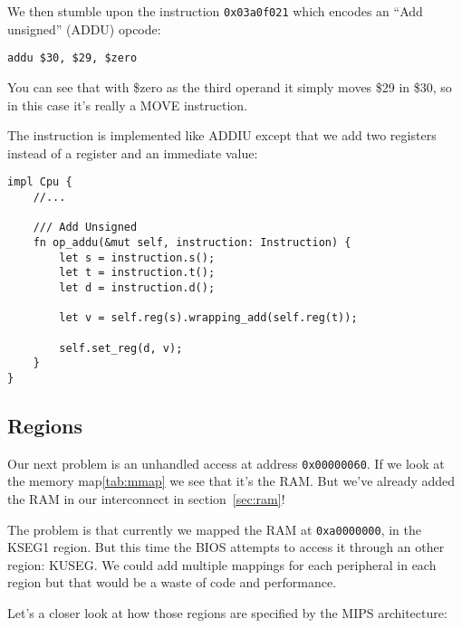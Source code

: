 \documentclass[a4paper]{article}
\newcommand{\code}[1] {\texttt{#1}}
\begin{document}
We then stumble upon the instruction \code{0x03a0f021} which encodes
an ``Add unsigned'' (ADDU) opcode:

\begin{lstlisting}[language=assembly]
addu $30, $29, $zero
\end{lstlisting}

You can see that with \$zero as the third operand it simply moves \$29
in \$30, so in this case it's really a MOVE instruction.

The instruction is implemented like ADDIU except that we add two
registers instead of a register and an immediate value:

\begin{lstlisting}
impl Cpu {
    //...

    /// Add Unsigned
    fn op_addu(&mut self, instruction: Instruction) {
        let s = instruction.s();
        let t = instruction.t();
        let d = instruction.d();

        let v = self.reg(s).wrapping_add(self.reg(t));

        self.set_reg(d, v);
    }
}
\end{lstlisting}

\subsection{Regions}

Our next problem is an unhandled access at address
\code{0x00000060}. If we look at the memory map\ref{tab:mmap} we see
  that it's the RAM. But we've already added the RAM in our
  interconnect in section~\ref{sec:ram}!

The problem is that currently we mapped the RAM at \code{0xa0000000},
in the KSEG1 region. But this time the BIOS attempts to access it
through an other region: KUSEG. We could add multiple mappings for
each peripheral in each region but that would be a waste of code and
performance.

Let's a closer look at how those regions are specified by the MIPS
architecture:
\end{document}
